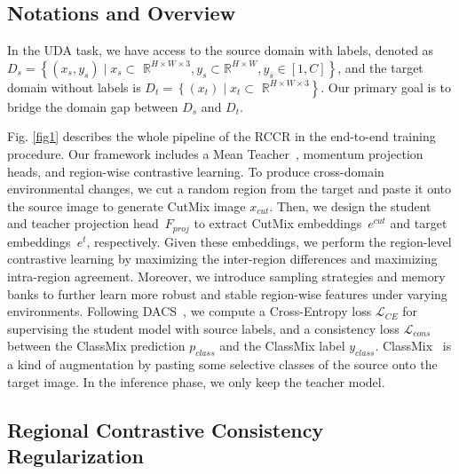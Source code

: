 \documentclass{article}
\begin{document}
\subsection{Notations and Overview}
\label{sec:3.1}
In the UDA task, we have access to the source domain with labels, denoted as $D_{s}=\left\{\left(x_{s}, y_{s}\right) \mid x_{s} \subset\right.$ $\left.\mathbb{R}^{H \times W \times 3}, y_{s} \subset \mathbb{R}^{H \times W}, y_{s} \in[1, C]\right\}$, and the target domain without labels is $D_{t}=\left\{\left(x_{t}\right) \mid x_{t} \subset\right.$ $\left.\mathbb{R}^{H \times W \times 3}\right\}$. Our primary goal is to bridge the domain gap between $D_{s}$ and $D_{t}$.


Fig. \ref{fig1} describes the whole pipeline of the RCCR in the end-to-end training procedure. Our framework includes a Mean Teacher~\cite{choi2019self}, momentum projection heads, and region-wise contrastive learning. To produce cross-domain environmental changes, we cut a random region from the target and paste it onto the source image to generate CutMix image $x_{cut}$. Then, we design the student and teacher projection head~$F_{proj}$ to extract CutMix embeddings~$e^{cut}$ and target embeddings~$e^t$, respectively. Given these embeddings, we perform the region-level contrastive learning by maximizing  the  inter-region  differences  and  maximizing intra-region agreement. Moreover, we introduce sampling strategies and memory banks to further learn more robust and stable region-wise features under varying environments.  Following DACS~\cite{tranheden2020dacs}, we compute a Cross-Entropy loss $\mathcal{L}_{CE}$ for supervising the student model with source labels, and a consistency loss $\mathcal{L}_{cons}$ between the ClassMix prediction $p_{class}$ and the ClassMix label $y_{class}$.  ClassMix~\cite{tranheden2020dacs} is a kind of augmentation by pasting some selective classes of the source onto the target image.
In the inference phase, we only keep the teacher model. 


\subsection{Regional Contrastive Consistency Regularization}
\label{sec:3.2}
\end{document}
